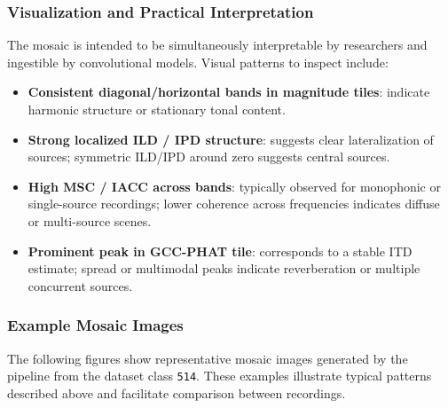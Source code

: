 \documentclass[12pt, a4paper]{article}
\begin{document}
\subsubsection{Visualization and Practical Interpretation}
The mosaic is intended to be simultaneously interpretable by researchers and ingestible by convolutional models. Visual patterns to inspect include:
\begin{itemize}
    \item \textbf{Consistent diagonal/horizontal bands in magnitude tiles}: indicate harmonic structure or stationary tonal content.
    \item \textbf{Strong localized ILD / IPD structure}: suggests clear lateralization of sources; symmetric ILD/IPD around zero suggests central sources.
    \item \textbf{High MSC / IACC across bands}: typically observed for monophonic or single-source recordings; lower coherence across frequencies indicates diffuse or multi-source scenes.
    \item \textbf{Prominent peak in GCC-PHAT tile}: corresponds to a stable ITD estimate; spread or multimodal peaks indicate reverberation or multiple concurrent sources.
\end{itemize}

\subsubsection{Example Mosaic Images}
The following figures show representative mosaic images generated by the pipeline from the dataset class \texttt{514}. These examples illustrate typical patterns described above and facilitate comparison between recordings.
\end{document}
